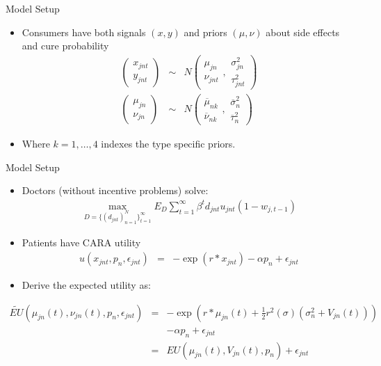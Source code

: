 \begin{frame}{Model Setup}
\begin{itemize}
\item Consumers have both signals $(x,y)$ and priors $(\mu,\nu)$ about side effects and cure probability
\begin{eqnarray*}
\left( \begin{smallmatrix} x_{jnt} \\ y_{jnt} \end{smallmatrix} \right)
&\sim& N \left( \begin{smallmatrix} \mu_{jn} \\ \nu_{jnt} \end{smallmatrix}, \begin{smallmatrix} \sigma^2_{jn} \\ \tau_{jnt}^2 \end{smallmatrix} \right) \\
\left( \begin{smallmatrix} \mu_{jn} \\ \nu_{jn} \end{smallmatrix} \right)
&\sim& N \left( \begin{smallmatrix} \overline{\mu}_{nk} \\ \overline{\nu}_{nk} \end{smallmatrix}, \begin{smallmatrix} \overline{\sigma}^2_{n} \\ \overline{\tau}_{n}^2 \end{smallmatrix} \right)
\end{eqnarray*}
\item Where $k=1,\ldots,4$ indexes the \alert{type specific priors}. 
\end{itemize}
\end{frame}

\begin{frame}{Model Setup}
\begin{itemize}
\item Doctors (without incentive problems) solve:
\begin{eqnarray*}
\max_{D=\{(d_{jnt})_{n=1}^N \}_{t=1}^{\infty}} E_D \sum_{t=1}^{\infty} \beta^t d_{jnt} u_{jnt}(1 - w_{j,t-1})
\end{eqnarray*}
\item Patients have CARA utility
\begin{eqnarray*}
u(x_{jnt},p_n,\epsilon_{jnt}) &=& -\exp(r *x_{jnt}) - \alpha p_n + \epsilon_{jnt}
\end{eqnarray*}
\item Derive the expected utility as:
\end{itemize}
\vspace{-0.5cm}
\begin{eqnarray*}
\tilde{EU}(\mu_{jn}(t),\nu_{jn}(t), p_n,\epsilon_{jnt}) &=& -\exp(r *\mu_{jn}(t) + \frac{1}{2} r^2(\sigma) (\sigma^2_n + V_{jn}(t))) \\
&& - \alpha p_n + \epsilon_{jnt}\\
&=& EU(\mu_{jn}(t),V_{jn}(t),p_n) + \epsilon_{jnt}
\end{eqnarray*}
\end{frame}

